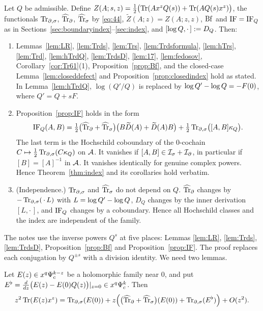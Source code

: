\begin{proposition}\label{tr:prop:transfer}
Let \(Q\) be admissible. Define \(Z(A;s,z)=\frac12\bigl(\operatorname{Tr}(Ax^zQ(s))+
\operatorname{Tr}(AQ(s)x^z)\bigr)\), the functionals \(\operatorname{Tr}_{\partial,\sigma}\), \(\widehat{\operatorname{Tr}}_\partial\), \(\widehat{\operatorname{Tr}}_\sigma\) by
\eqref{eq:44}, \(\widetilde Z(A;z)=Z(A;z,z)\), \(\operatorname{Bf}\) and
\(\operatorname{IF}=\operatorname{IF}_Q\) as in Sections~\ref{sec:boundaryindex}--\ref{sec:index}, and
\([\log Q,\cdot\,]:=D_Q\). Then:
\begin{enumerate}
\item Lemmas~\ref{lem:LR}, \ref{lem:Trds}, \ref{lem:Trs},
\ref{lem:Trdsformula}, \ref{lem:hTrs}, \ref{lem:Trd}, \ref{lem:hTrdQ},
\ref{lem:TrdsD}, \ref{lem:17}, \ref{lem:fedosov},
Corollary~\ref{cor:Tr61}(1), Proposition~\ref{prop:Bf}, and the closed-case
Lemma~\ref{lem:closeddefect} and Proposition~\ref{prop:closedindex} hold as
stated. In Lemma~\ref{lem:hTrdQ}, \(\log(Q'/Q)\) is replaced by
\(\log Q'-\log Q=-F(0)\), where \(Q'=Q+sF\).
\item Proposition~\ref{prop:IF} holds in the form
\[
 \operatorname{IF}_Q(A,B)=\tfrac12\bigl(\widehat{\operatorname{Tr}}_\partial+\widehat{\operatorname{Tr}}_\sigma\bigr)\bigl(B\widetilde D(A)+
 \widetilde D(A)B\bigr)+\tfrac12\operatorname{Tr}_{\partial,\sigma}\bigl([A,B]\kappa_Q\bigr).
\]
The last term is the Hochschild coboundary of the \(0\)-cochain
\(C\mapsto\frac12\operatorname{Tr}_{\partial,\sigma}(C\kappa_Q)\) on \(\mathcal A\). It vanishes if \([A,B]\in
\mathcal I_\sigma+\mathcal I_\partial\), in particular if \([B]=[A]^{-1}\) in \(\mathcal A\). It vanishes
identically for genuine complex powers. Hence Theorem~\ref{thm:index} and
its corollaries hold verbatim.
\item (Independence.) \(\operatorname{Tr}_{\partial,\sigma}\) and \(\widehat{\operatorname{Tr}}_\sigma\) do not depend on \(Q\).
\(\widehat{\operatorname{Tr}}_\partial\) changes by \(-\operatorname{Tr}_{\partial,\sigma}(\,\cdot\,L)\) with \(L=\log Q'-\log Q\),
\(D_Q\) changes by the inner derivation \([L,\cdot\,]\), and \(\operatorname{IF}_Q\)
changes by a coboundary. Hence all Hochschild classes and the index are
independent of the family.
\end{enumerate}
\end{proposition}

The notes use the inverse powers \(Q^{s}\) at five places: Lemmas
\ref{lem:LR}, \ref{lem:Trds}, \ref{lem:TrdsD}, Proposition~\ref{prop:Bf}
and Proposition~\ref{prop:IF}. The proof replaces each conjugation by
\(Q^{\pm s}\) with a division identity. We need two lemmas.

\begin{lemma}\label{tr:lem:diag}
Let \(E(z)\in x^q\Psi_{c}^{k-z}\) be a holomorphic family near \(0\), and put
\(E^\flat=\frac{d}{dz}\bigl(E(z)-E(0)Q(z)\bigr)|_{z=0}\in x^q\Psi_{c}^k\). Then
\[
 z^2\operatorname{Tr}(E(z)x^z)=\operatorname{Tr}_{\partial,\sigma}(E(0))+z\Bigl(\bigl(\widehat{\operatorname{Tr}}_\partial+\widehat{\operatorname{Tr}}_\sigma\bigr)(E(0))+
 \operatorname{Tr}_{\partial,\sigma}(E^\flat)\Bigr)+O(z^2).
\]
\end{lemma}

